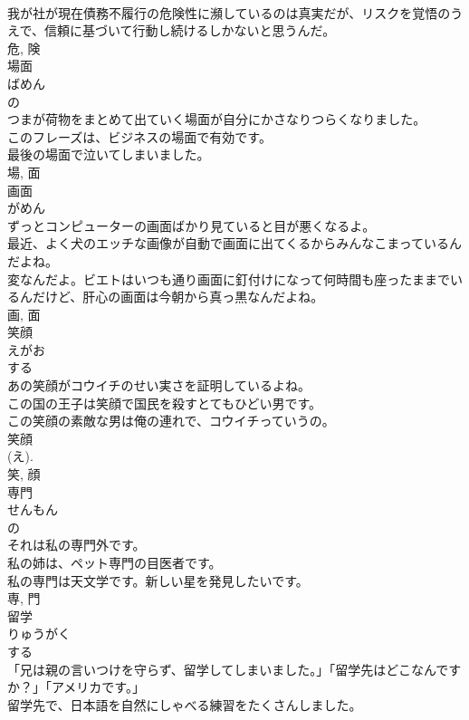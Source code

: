 \documentclass[8pt]{extreport}
\begin{document}
\begin{CJK}{UTF8}{min}
\\	我が社が現在債務不履行の危険性に瀕しているのは真実だが、リスクを覚悟のうえで、信頼に基づいて行動し続けるしかないと思うんだ。	
\\	危, 険	
\\	場面	
\\	ばめん	
\\	の 
\\	つまが荷物をまとめて出ていく場面が自分にかさなりつらくなりました。	
\\	このフレーズは、ビジネスの場面で有効です。	
\\	最後の場面で泣いてしまいました。	
\\	場, 面	
\\	画面	
\\	がめん	
\\	ずっとコンピューターの画面ばかり見ていると目が悪くなるよ。	
\\	最近、よく犬のエッチな画像が自動で画面に出てくるからみんなこまっているんだよね。	
\\	変なんだよ。ビエトはいつも通り画面に釘付けになって何時間も座ったままでいるんだけど、肝心の画面は今朝から真っ黒なんだよね。	
\\	画, 面	
\\	笑顔	
\\	えがお	
\\	する 
\\	あの笑顔がコウイチのせい実さを証明しているよね。	
\\	この国の王子は笑顔で国民を殺すとてもひどい男です。	
\\	この笑顔の素敵な男は俺の連れで、コウイチっていうの。	
\\	笑顔
\\	(え).
\\	笑, 顔	
\\	専門	
\\	せんもん	
\\	の 
\\	それは私の専門外です。	
\\	私の姉は、ペット専門の目医者です。	
\\	私の専門は天文学です。新しい星を発見したいです。	
\\	専, 門	
\\	留学	
\\	りゅうがく	
\\	する 
\\	「兄は親の言いつけを守らず、留学してしまいました。」「留学先はどこなんですか？」「アメリカです。」	
\\	留学先で、日本語を自然にしゃべる練習をたくさんしました。	

\end{CJK}
\end{document}
